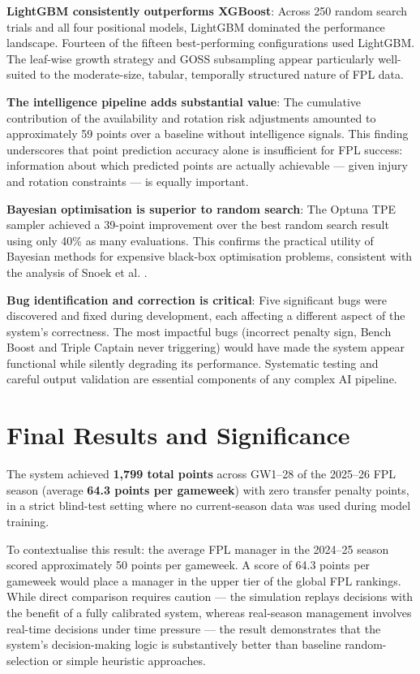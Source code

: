 \textbf{LightGBM consistently outperforms XGBoost}: Across 250 random search trials and all four positional models, LightGBM dominated the performance landscape. Fourteen of the fifteen best-performing configurations used LightGBM. The leaf-wise growth strategy and GOSS subsampling appear particularly well-suited to the moderate-size, tabular, temporally structured nature of FPL data.

\textbf{The intelligence pipeline adds substantial value}: The cumulative contribution of the availability and rotation risk adjustments amounted to approximately 59 points over a baseline without intelligence signals. This finding underscores that point prediction accuracy alone is insufficient for FPL success: information about which predicted points are actually achievable — given injury and rotation constraints — is equally important.

\textbf{Bayesian optimisation is superior to random search}: The Optuna TPE sampler achieved a 39-point improvement over the best random search result using only 40\% as many evaluations. This confirms the practical utility of Bayesian methods for expensive black-box optimisation problems, consistent with the analysis of Snoek et al. \cite{snoek2012practical}.

\textbf{Bug identification and correction is critical}: Five significant bugs were discovered and fixed during development, each affecting a different aspect of the system's correctness. The most impactful bugs (incorrect penalty sign, Bench Boost and Triple Captain never triggering) would have made the system appear functional while silently degrading its performance. Systematic testing and careful output validation are essential components of any complex AI pipeline.

\section{Final Results and Significance}

The system achieved \textbf{1,799 total points} across GW1--28 of the 2025--26 FPL season (average \textbf{64.3 points per gameweek}) with zero transfer penalty points, in a strict blind-test setting where no current-season data was used during model training.

To contextualise this result: the average FPL manager in the 2024--25 season scored approximately 50 points per gameweek. A score of 64.3 points per gameweek would place a manager in the upper tier of the global FPL rankings. While direct comparison requires caution — the simulation replays decisions with the benefit of a fully calibrated system, whereas real-season management involves real-time decisions under time pressure — the result demonstrates that the system's decision-making logic is substantively better than baseline random-selection or simple heuristic approaches.

